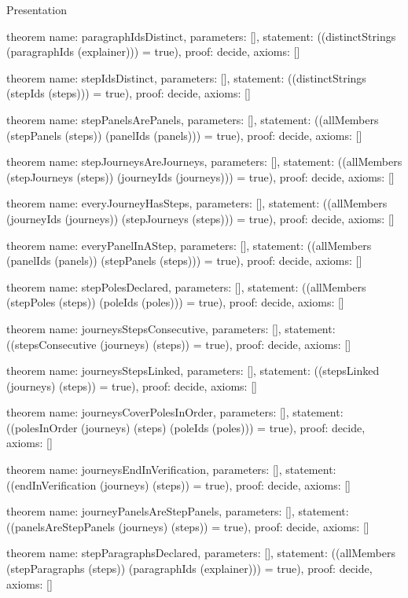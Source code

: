 \begin{lexlean}{Presentation}
\begin{semanticmodule}
theorem{
  name: paragraphIdsDistinct,
  parameters: [],
  statement: ((distinctStrings (paragraphIds (explainer))) = true),
  proof: decide{},
  axioms: []
}

theorem{
  name: stepIdsDistinct,
  parameters: [],
  statement: ((distinctStrings (stepIds (steps))) = true),
  proof: decide{},
  axioms: []
}

theorem{
  name: stepPanelsArePanels,
  parameters: [],
  statement: ((allMembers (stepPanels (steps)) (panelIds (panels))) = true),
  proof: decide{},
  axioms: []
}

theorem{
  name: stepJourneysAreJourneys,
  parameters: [],
  statement: ((allMembers (stepJourneys (steps)) (journeyIds (journeys))) = true),
  proof: decide{},
  axioms: []
}

theorem{
  name: everyJourneyHasSteps,
  parameters: [],
  statement: ((allMembers (journeyIds (journeys)) (stepJourneys (steps))) = true),
  proof: decide{},
  axioms: []
}

theorem{
  name: everyPanelInAStep,
  parameters: [],
  statement: ((allMembers (panelIds (panels)) (stepPanels (steps))) = true),
  proof: decide{},
  axioms: []
}

theorem{
  name: stepPolesDeclared,
  parameters: [],
  statement: ((allMembers (stepPoles (steps)) (poleIds (poles))) = true),
  proof: decide{},
  axioms: []
}

theorem{
  name: journeysStepsConsecutive,
  parameters: [],
  statement: ((stepsConsecutive (journeys) (steps)) = true),
  proof: decide{},
  axioms: []
}

theorem{
  name: journeysStepsLinked,
  parameters: [],
  statement: ((stepsLinked (journeys) (steps)) = true),
  proof: decide{},
  axioms: []
}

theorem{
  name: journeysCoverPolesInOrder,
  parameters: [],
  statement: ((polesInOrder (journeys) (steps) (poleIds (poles))) = true),
  proof: decide{},
  axioms: []
}

theorem{
  name: journeysEndInVerification,
  parameters: [],
  statement: ((endInVerification (journeys) (steps)) = true),
  proof: decide{},
  axioms: []
}

theorem{
  name: journeyPanelsAreStepPanels,
  parameters: [],
  statement: ((panelsAreStepPanels (journeys) (steps)) = true),
  proof: decide{},
  axioms: []
}

theorem{
  name: stepParagraphsDeclared,
  parameters: [],
  statement: ((allMembers (stepParagraphs (steps)) (paragraphIds (explainer))) = true),
  proof: decide{},
  axioms: []
}


\end{semanticmodule}
\end{lexlean}
